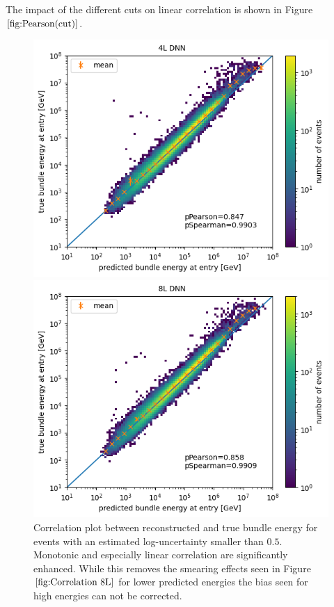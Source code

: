 \documentclass[
  tucolor,       %
  BCOR=12mm,     %
  parskip=half,  %
  open=any,      %
  cleardoublepage=plain,  %
]{tudothesis}
\begin{document}
The impact of the different cuts on linear correlation is shown in Figure $\ref{fig:Pearson(cut)}$.
\begin{figure}[h]
  \centering
  \begin{minipage}[t]{0.49\textwidth}
    \includegraphics[width=\textwidth]{Plots/Correlation bundle energy (4L, cut)}
  \end{minipage}
  \begin{minipage}[t]{0.49\textwidth}
    \includegraphics[width=\textwidth]{Plots/Correlation bundle energy (8L, cut)}
  \end{minipage}
  \caption{Correlation plot between reconstructed and true bundle energy for events with an estimated log-uncertainty smaller than $0.5$. Monotonic and especially linear correlation are significantly enhanced. While this removes the smearing effects seen in Figure $\ref{fig:Correlation 8L}$ for lower predicted energies the bias seen for high energies can not be corrected.}
  \label{fig:Correlation cut}
\end{figure}
\end{document}

